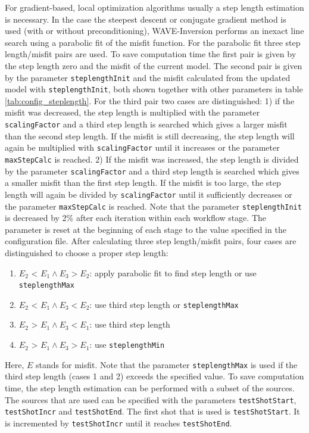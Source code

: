 \documentclass[pdftex,a4paper,parskip,listof=totoc,bibliography=totoc,onehalfspacing,12pt]{scrreprt}
\begin{document}
For gradient-based, local optimization algorithms usually a step length estimation is necessary. In the case the steepest descent or conjugate gradient method is used (with or without preconditioning), WAVE-Inversion performs an inexact line search using a parabolic fit of the misfit function. For the parabolic fit three step length/misfit pairs are used. To save computation time the first pair is given by the step length zero and the misfit of the current model. The second pair is given by the parameter \verb+steplengthInit+ and the misfit calculated from the updated model with \verb+steplengthInit+, both shown together with other parameters in table \ref{tab:config_steplength}. For the third pair two cases are distinguished: 1) if the misfit was decreased, the step length is multiplied with the parameter \verb+scalingFactor+ and a third step length is searched which gives a larger misfit than the second step length. If the misfit is still decreasing, the step length will again be multiplied with \verb+scalingFactor+ until it increases or the parameter \verb+maxStepCalc+ is reached. 2) If the misfit was increased, the step length is divided by the parameter \verb+scalingFactor+ and a third step length is searched which gives a smaller misfit than the first step length. If the misfit is too large, the step length will again be divided by \verb+scalingFactor+ until it sufficiently decreases or the parameter \verb+maxStepCalc+ is reached.
Note that the parameter \verb+steplengthInit+ is decreased by 2\% after each iteration within each workflow stage. The parameter is reset at the beginning of each stage to the value specified in the configuration file.
After calculating three step length/misfit pairs, four cases are distinguished to choose a proper step length:

\begin{enumerate}
 \item $E_2$ < $E_1 \land E_3 > E_2$: apply parabolic fit to find step length or use \verb+steplengthMax+ 
 \item $E_2$ < $E_1 \land E_3 < E_2$: use third step length or \verb+steplengthMax+
 \item $E_2$ > $E_1 \land E_3 < E_1$: use third step length 
 \item $E_2$ > $E_1 \land E_3 > E_1$: use \verb+steplengthMin+
\end{enumerate}

Here, $E$ stands for misfit. Note that the parameter \verb+steplengthMax+ is used if the third step length (cases 1 and 2) exceeds the specified value.
To save computation time, the step length estimation can be performed with a subset of the sources. The sources that are used can be specified with the parameters \verb+testShotStart+, \verb+testShotIncr+ and \verb+testShotEnd+. The first shot that is used is \verb+testShotStart+. It is incremented by \verb+testShotIncr+ until it reaches \verb+testShotEnd+.
\end{document}
